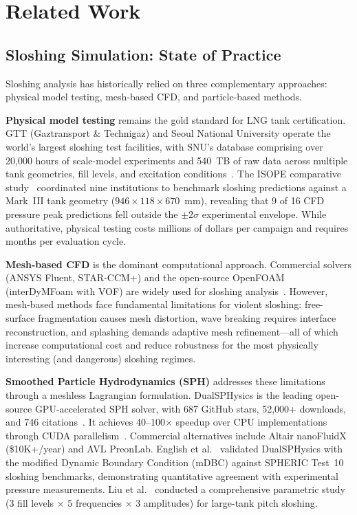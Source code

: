 \documentclass[11pt]{article}
\begin{document}
\section{Related Work}

\subsection{Sloshing Simulation: State of Practice}

Sloshing analysis has historically relied on three complementary approaches: physical model testing, mesh-based CFD, and particle-based methods.

\textbf{Physical model testing} remains the gold standard for LNG tank certification. GTT (Gaztransport \& Technigaz) and Seoul National University operate the world's largest sloshing test facilities, with SNU's database comprising over 20,000 hours of scale-model experiments and 540~TB of raw data across multiple tank geometries, fill levels, and excitation conditions~\citep{kim2019sloshing}. The ISOPE comparative study~\citep{isope2012sloshing} coordinated nine institutions to benchmark sloshing predictions against a Mark~III tank geometry ($946{\times}118{\times}670$~mm), revealing that 9 of 16 CFD pressure peak predictions fell outside the $\pm 2\sigma$ experimental envelope. While authoritative, physical testing costs millions of dollars per campaign and requires months per evaluation cycle.

\textbf{Mesh-based CFD} is the dominant computational approach. Commercial solvers (ANSYS Fluent, STAR-CCM+) and the open-source OpenFOAM (interDyMFoam with VOF) are widely used for sloshing analysis~\citep{chen2018sloshing}. However, mesh-based methods face fundamental limitations for violent sloshing: free-surface fragmentation causes mesh distortion, wave breaking requires interface reconstruction, and splashing demands adaptive mesh refinement---all of which increase computational cost and reduce robustness for the most physically interesting (and dangerous) sloshing regimes.

\textbf{Smoothed Particle Hydrodynamics (SPH)} addresses these limitations through a meshless Lagrangian formulation. DualSPHysics is the leading open-source GPU-accelerated SPH solver, with 687 GitHub stars, 52,000+ downloads, and 746 citations~\citep{dominguez2022dualsphysics}. It achieves 40--100$\times$ speedup over CPU implementations through CUDA parallelism~\citep{crespo2011gpu}. Commercial alternatives include Altair nanoFluidX (\$10K+/year) and AVL PreonLab. English et al.~\citep{english2021mdbc} validated DualSPHysics with the modified Dynamic Boundary Condition (mDBC) against SPHERIC Test~10 sloshing benchmarks, demonstrating quantitative agreement with experimental pressure measurements. Liu et al.~\citep{liu2024pitch} conducted a comprehensive parametric study (3 fill levels $\times$ 5 frequencies $\times$ 3 amplitudes) for large-tank pitch sloshing.
\end{document}
